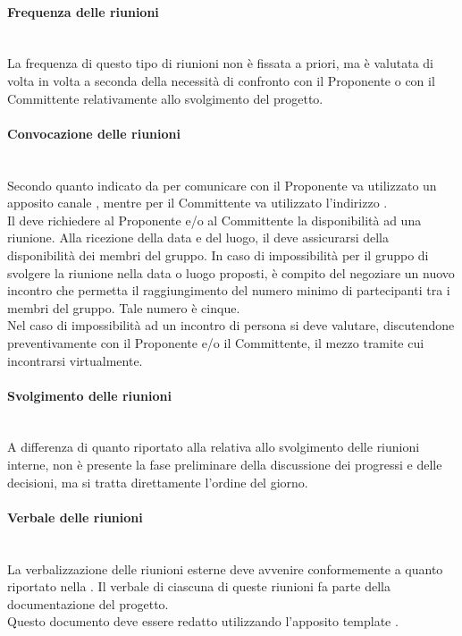 \paragraph{Frequenza delle riunioni}\mbox{}\\
La frequenza di questo tipo di riunioni non è fissata a priori, ma è valutata di volta in volta a seconda della necessità di confronto con il Proponente o con il Committente relativamente allo svolgimento del progetto.

\paragraph{Convocazione delle riunioni}\mbox{}\\
Secondo quanto indicato da \Proponente{} per comunicare con il Proponente va utilizzato un apposito canale , mentre per il Committente va utilizzato l'indirizzo \email{} \href{mailto:\GroupEmail}{\GroupEmail}.\\
Il \Responsabile{} deve richiedere al Proponente e/o al Committente la disponibilità ad una riunione. Alla ricezione della data e del luogo, il \Responsabile{} deve assicurarsi della disponibilità dei membri del gruppo. In caso di impossibilità per il gruppo di svolgere la riunione nella data o luogo proposti, è compito del \Responsabile{} negoziare un nuovo incontro che permetta il raggiungimento del numero minimo di partecipanti tra i membri del gruppo. Tale numero è cinque.\\
Nel caso di impossibilità ad un incontro di persona si deve valutare, discutendone preventivamente con il Proponente e/o il Committente, il mezzo tramite cui incontrarsi virtualmente.

\paragraph{Svolgimento delle riunioni}\mbox{}\\
A differenza di quanto riportato alla  relativa allo svolgimento delle riunioni interne, non è presente la fase preliminare della discussione dei progressi e delle decisioni, ma si tratta direttamente l'ordine del giorno.

\paragraph{Verbale delle riunioni}\mbox{}\\
La verbalizzazione delle riunioni esterne deve avvenire conformemente a quanto riportato nella . Il verbale di ciascuna di queste riunioni fa parte della documentazione del progetto.\\
Questo documento deve essere redatto utilizzando l'apposito template \glossario{\LaTeX{}}.

